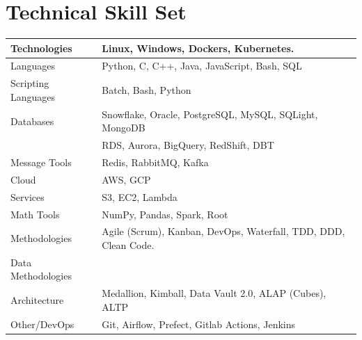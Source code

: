 \section{Technical Skill Set}

\begin{center}
  \begin{tabular}{|| l | l ||}
      \hline
      \hline
      Technologies & Linux, Windows, Dockers, Kubernetes. \\
      \hline
      Languages & Python, C, C++, Java, JavaScript, Bash, SQL \\ %
    \hline
      Scripting Languages \hspace{3mm} & Batch, Bash, Python\\ %
    \hline
      Databases & Snowflake, Oracle, PostgreSQL, MySQL, SQLight, MongoDB \\ & RDS, Aurora, BigQuery, RedShift, DBT\\ %
    \hline
      Message Tools & Redis, RabbitMQ, Kafka \\
    \hline
      Cloud & AWS, GCP\\ %
    \hline
      Services & S3, EC2, Lambda\\ %
    \hline
      Math Tools & NumPy, Pandas, Spark, Root \\
    \hline
      Methodologies & Agile (Scrum), Kanban, DevOps, Waterfall, TDD, DDD, Clean Code. \\
    \hline
      Data Methodologies\\ Architecture & Medallion, Kimball, Data Vault 2.0, ALAP (Cubes), ALTP \\
    \hline
      Other/DevOps & Git, Airflow, Prefect, Gitlab Actions, Jenkins \\
    \hline
    \hline
  \end{tabular}
\end{center}

